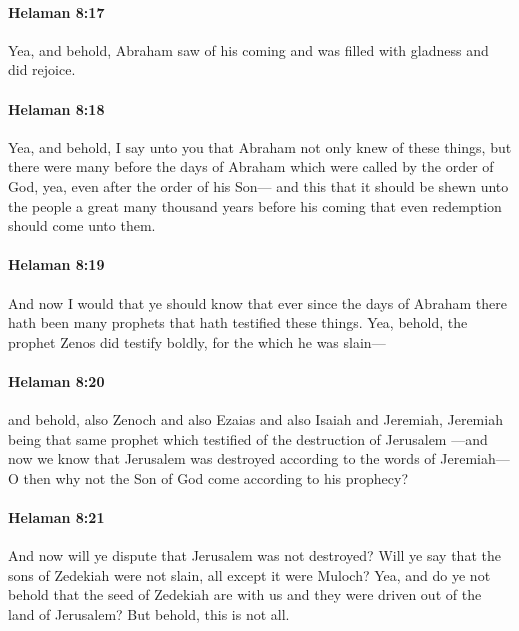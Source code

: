 		\paragraph{Helaman 8:17} %
			\label{HELAMAN-8-17}

			Yea, and behold, Abraham saw of his coming
			and was filled with gladness and did rejoice.

		\paragraph{Helaman 8:18} %
			\label{HELAMAN-8-18}

			Yea, and behold, I say unto you that Abraham not only knew of these things,
			but there were many before the days of Abraham
			which were called by the order of God,
			yea, even after the order of his Son---
			and this that it should be shewn unto the people
			a great many thousand years before his coming
			that even redemption should come unto them.

		\paragraph{Helaman 8:19} %
			\label{HELAMAN-8-19}

			And now I would that ye should know
			that ever since the days of Abraham
			there hath been many prophets that hath testified these things.
			Yea, behold, the prophet Zenos did testify boldly,
			for the which he was slain---

		\paragraph{Helaman 8:20} %
			\label{HELAMAN-8-20}

			and behold, also Zenoch and also Ezaias and also Isaiah and Jeremiah,
			Jeremiah being that same prophet which testified of the destruction of Jerusalem
			---and now we know that Jerusalem was destroyed
			according to the words of Jeremiah---
			O then why not the Son of God come according to his prophecy?

		\paragraph{Helaman 8:21} %
			\label{HELAMAN-8-21}

			And now will ye dispute that Jerusalem was not destroyed?
			Will ye say that the sons of Zedekiah were not slain,
			all except it were Muloch?
			Yea, and do ye not behold that the seed of Zedekiah are with us
			and they were driven out of the land of Jerusalem?
			But behold, this is not all.

